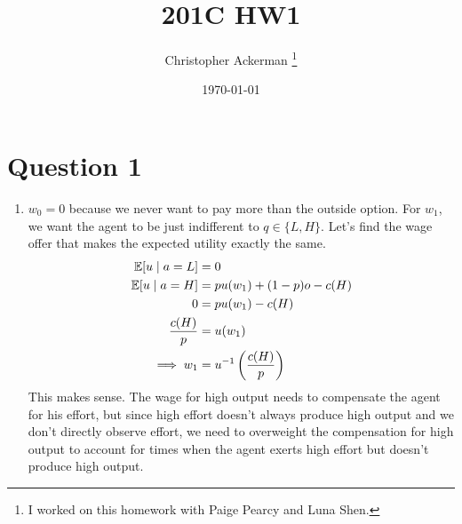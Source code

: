 

\title{201C HW1}
\author{Christopher Ackerman \thanks{I worked on this homework with Paige Pearcy and Luna Shen.}}
\date{\today}


\maketitle
\newpage
\section{Question 1}
\begin{enumerate}[label=\alph*)]
\item 
  $w_0 = 0$ because we never want to pay more than the outside option. For $w_1$, we want the agent to be just indifferent to $q \in \{L, H\}.$ Let's find the wage offer that makes the expected utility exactly the same.
  \begin{align*}
    \mathbb{E}[u \mid a = L] &= 0 \\
    \mathbb{E}[u \mid a = H] &= p u(w_1) + (1 - p) o - c(H)\\
    0 &= p u(w_1) - c(H)\\
    \frac{c(H)}{p} &= u(w_1)\\
    \implies w_1 &= u^{-1} \left(\frac{c(H)}{p}\right)
  \end{align*}
  This makes sense. The wage for high output needs to compensate the agent for his effort, but since high effort doesn't always produce high output and we don't directly observe effort, we need to overweight the compensation for high output to account for times when the agent exerts high effort but doesn't produce high output.


\end{enumerate}
